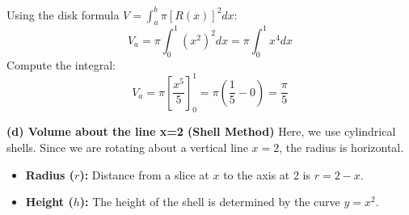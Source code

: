 Using the disk formula $V = \int_{a}^{b} \pi [R(x)]^2 dx$:
\[ V_a = \pi \int_{0}^{1} (x^2)^2 dx = \pi \int_{0}^{1} x^4 dx \]
Compute the integral:
\[ V_a = \pi \left[ \frac{x^5}{5} \right]_{0}^{1} = \pi \left( \frac{1}{5} - 0 \right) = \boxed{\frac{\pi}{5}} \]

\textbf{(d) Volume about the line x=2 (Shell Method)}
Here, we use cylindrical shells. Since we are rotating about a vertical line $x=2$, the radius is horizontal.
\begin{itemize}
    \item \textbf{Radius ($r$):} Distance from a slice at $x$ to the axis at 2 is $r = 2 - x$.
    \item \textbf{Height ($h$):} The height of the shell is determined by the curve $y=x^2$.
\end{itemize}

